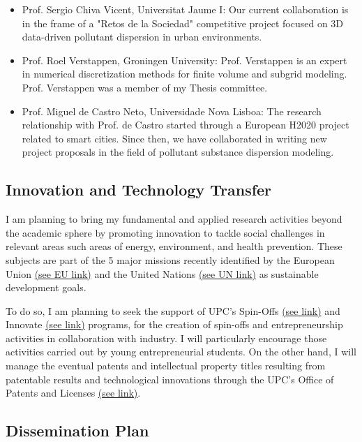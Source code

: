 \documentclass{article}
\begin{document}
\begin{itemize}
\item Prof. Sergio Chiva Vicent, Universitat Jaume I: Our current collaboration is in the frame of a "Retos de la Sociedad" competitive project focused on 3D data-driven pollutant dispersion in urban environments. 
\item Prof. Roel Verstappen, Groningen University: Prof. Verstappen is an expert in numerical discretization methods for finite volume and subgrid modeling. Prof. Verstappen was a member of my Thesis committee.   
\item Prof. Miguel de Castro Neto, Universidade Nova Lisboa: The research relationship with Prof. de Castro started through a European H2020 project related to smart cities. Since then, we have collaborated in writing new project proposals in the field of pollutant substance dispersion modeling.
\end{itemize}


\subsection{Innovation and Technology Transfer}

I am planning to bring my fundamental and applied research activities beyond the academic sphere by promoting innovation to tackle social challenges in relevant areas such areas of energy, environment, and health prevention. These subjects are part of the 5 major missions recently identified by the European Union \href{https://ec.europa.eu/commission/presscorner/detail/en/IP_21_4747}{(see EU link)} and the United Nations \href{https://www.un.org/sustainabledevelopment}{(see UN link)} as sustainable development goals. 

To do so, I am planning to seek the support of UPC's Spin-Offs \href{https://www.upc.edu/innovacio}{(see link)} and Innovate \href{https://www.upc.edu/emprenupc}{(see link)} programs, for the creation of spin-offs and entrepreneurship activities in collaboration with industry. I will particularly encourage those activities carried out by young entrepreneurial students. On the other hand, I will manage the eventual patents and intellectual property titles resulting from patentable results and technological innovations through the UPC's Office of Patents and Licenses \href{https://www.upc.edu/innovacio/ca/oficina-patents}{(see link)}.

\subsection{Dissemination Plan} 
\end{document}
